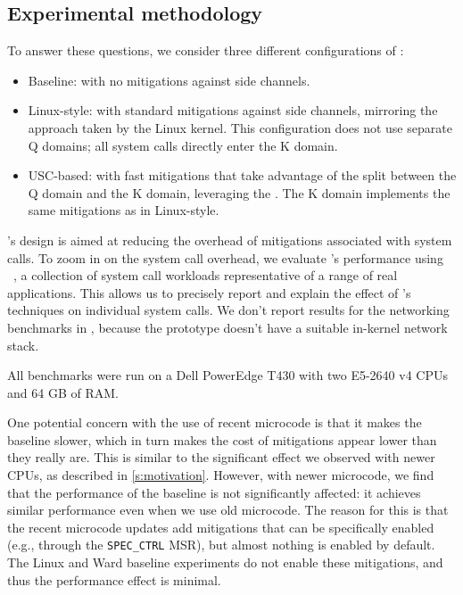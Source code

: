 \subsection*{Experimental methodology}

To answer these questions, we consider three different configurations of \sys:

\begin{itemize}
\item Baseline: \sys with no mitigations against side channels.

\item Linux-style: \sys with standard mitigations against side channels,
mirroring the approach taken by the Linux kernel.  This configuration does
not use separate Q domains; all system calls directly enter the K domain.

\item USC-based: \sys with fast mitigations that take advantage of the split
between the Q domain and the K domain, leveraging the \contract{}.  The
K domain implements the same mitigations as in Linux-style.

\end{itemize}

\sys's design is aimed at reducing the overhead of mitigations
associated with system calls.  To zoom in on the system call overhead,
we evaluate \sys's performance using \bench~\cite{lebench}, a
collection of system call workloads representative of a range of real
applications.  This allows us to precisely report and explain the
effect of \sys's techniques on individual system calls.  We don't
report results for the networking benchmarks in \bench, because the
\sys prototype doesn't have a suitable in-kernel network stack.

All benchmarks were run on a Dell PowerEdge T430 with two E5-2640 v4
CPUs and 64 GB of RAM.


One potential concern with the use of recent microcode is that it makes
the baseline slower, which in turn makes the cost of mitigations appear
lower than they really are.  This is similar to the significant effect
we observed with newer CPUs, as described in \autoref{s:motivation}.
However, with newer microcode, we find that the performance of the
baseline is not significantly affected: it achieves similar performance
even when we use old microcode.  The reason for this is that the recent
microcode updates add mitigations that can be specifically enabled (e.g.,
through the \texttt{SPEC\_CTRL} MSR), but almost nothing is enabled by
default.  The Linux and Ward baseline experiments do not enable these
mitigations, and thus the performance effect is minimal.

